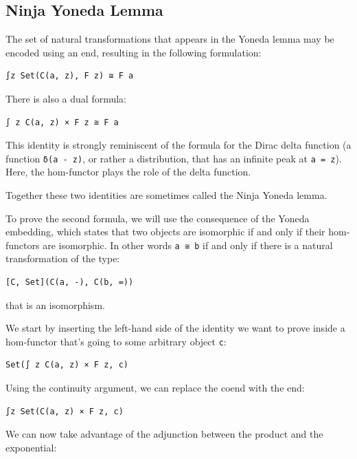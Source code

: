 \subsection{Ninja Yoneda Lemma}\label{ninja-yoneda-lemma}

The set of natural transformations that appears in the Yoneda lemma may
be encoded using an end, resulting in the following formulation:

\begin{verbatim}
∫z Set(C(a, z), F z) ≅ F a
\end{verbatim}

There is also a dual formula:

\begin{verbatim}
∫ z C(a, z) × F z ≅ F a
\end{verbatim}

This identity is strongly reminiscent of the formula for the Dirac delta
function (a function \texttt{δ(a\ -\ z)}, or rather a distribution, that
has an infinite peak at \texttt{a\ =\ z}). Here, the hom-functor plays
the role of the delta function.

Together these two identities are sometimes called the Ninja Yoneda
lemma.

To prove the second formula, we will use the consequence of the Yoneda
embedding, which states that two objects are isomorphic if and only if
their hom-functors are isomorphic. In other words \texttt{a\ ≅\ b} if
and only if there is a natural transformation of the type:

\begin{verbatim}
[C, Set](C(a, -), C(b, =))
\end{verbatim}

that is an isomorphism.

We start by inserting the left-hand side of the identity we want to
prove inside a hom-functor that's going to some arbitrary object
\texttt{c}:

\begin{verbatim}
Set(∫ z C(a, z) × F z, c)
\end{verbatim}

Using the continuity argument, we can replace the coend with the end:

\begin{verbatim}
∫z Set(C(a, z) × F z, c)
\end{verbatim}

We can now take advantage of the adjunction between the product and the
exponential:

